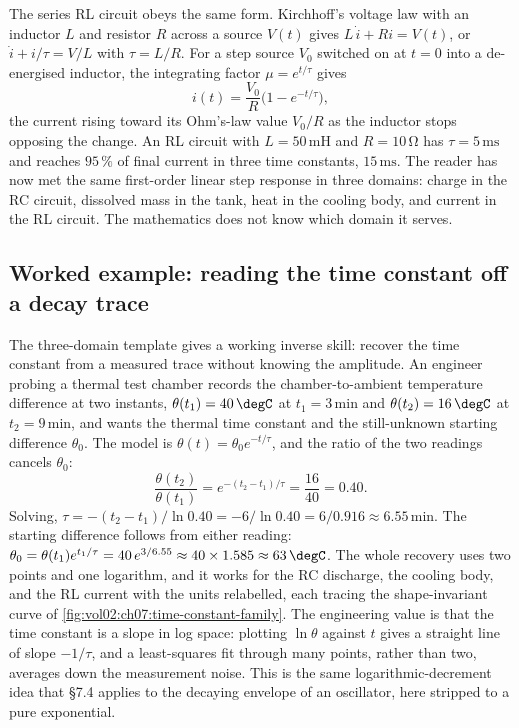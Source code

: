 The series RL circuit obeys the same form. Kirchhoff's voltage law
with an inductor $L$ and resistor $R$ across a source $V(t)$ gives
$L\, \dot{i} + R i = V(t)$, or $\dot{i} + i/\tau = V/L$ with
$\tau = L/R$. For a step source $V_{0}$ switched on at $t = 0$ into a
de-energised inductor, the integrating factor $\mu = e^{t/\tau}$ gives
\[
i(t) = \frac{V_{0}}{R}\bigl(1 - e^{-t/\tau}\bigr),
\]
the current rising toward its Ohm's-law value $V_{0}/R$ as the
inductor stops opposing the change. An RL circuit with
$L = 50\,\si{\milli\henry}$ and $R = 10\,\si{\ohm}$ has
$\tau = 5\,\si{\milli\second}$ and reaches $95\,\%$ of final current
in three time constants, $15\,\si{\milli\second}$. The reader has now
met the same first-order linear step response in three domains:
charge in the RC circuit, dissolved mass in the tank, heat in the
cooling body, and current in the RL circuit. The mathematics does not
know which domain it serves.



\subsection{Worked example: reading the time constant off a decay trace}

The three-domain template gives a working inverse skill: recover the
time constant from a measured trace without knowing the amplitude. An
engineer probing a thermal test chamber records the chamber-to-ambient
temperature difference at two instants, $\theta(t_{1}) = 40\,\degC$ at
$t_{1} = 3\,\si{\minute}$ and $\theta(t_{2}) = 16\,\degC$ at
$t_{2} = 9\,\si{\minute}$, and wants the thermal time constant and the
still-unknown starting difference $\theta_{0}$. The model is
$\theta(t) = \theta_{0} e^{-t/\tau}$, and the ratio of the two readings
cancels $\theta_{0}$:
\[
\frac{\theta(t_{2})}{\theta(t_{1})} = e^{-(t_{2} - t_{1})/\tau}
= \frac{16}{40} = 0.40.
\]
Solving, $\tau = -(t_{2} - t_{1})/\ln 0.40 = -6/\ln 0.40 = 6/0.916
\approx 6.55\,\si{\minute}$. The starting difference follows from
either reading: $\theta_{0} = \theta(t_{1}) e^{t_{1}/\tau} = 40\,
e^{3/6.55} \approx 40 \times 1.585 \approx 63\,\degC$. The whole
recovery uses two points and one logarithm, and it works for the RC
discharge, the cooling body, and the RL current with the units
relabelled, each tracing the shape-invariant curve of
\cref{fig:vol02:ch07:time-constant-family}. The engineering value is that the time constant is a slope
in log space: plotting $\ln\theta$ against $t$ gives a straight line of
slope $-1/\tau$, and a least-squares fit through many points, rather
than two, averages down the measurement noise. This is the same
logarithmic-decrement idea that \S7.4 applies to the decaying envelope
of an oscillator, here stripped to a pure exponential.

